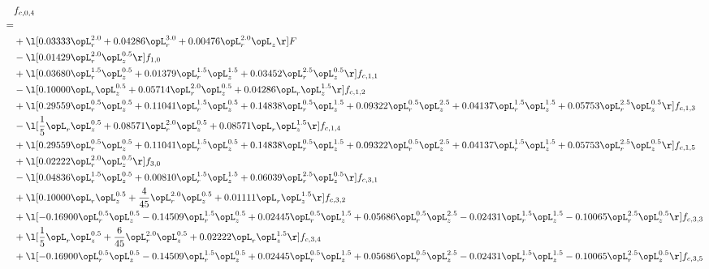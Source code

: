 \begin{alignat}{2} 
\label{eq:f_04_1} 
& f_{c,0,4} \nonumber \\ 
 = \\ 
& + \l[  0.03333 \opL_r^{2.0} +  0.04286 \opL_r^{3.0} +  0.00476 \opL_r^{2.0} \opL_z  \r] F \nonumber \\ 
& - \l[  0.01429 \opL_r^{2.0} \opL_z^{0.5}  \r] f_{1,0} \nonumber \\ 
& + \l[  0.03680 \opL_r^{1.5} \opL_z^{0.5} +  0.01379 \opL_r^{1.5} \opL_z^{1.5} +  0.03452 \opL_r^{2.5} \opL_z^{0.5}  \r] f_{c,1,1} \nonumber \\ 
& - \l[  0.10000 \opL_r \opL_z^{0.5} +  0.05714 \opL_r^{2.0} \opL_z^{0.5} +  0.04286 \opL_r \opL_z^{1.5}  \r] f_{c,1,2} \nonumber \\ 
& + \l[  0.29559 \opL_r^{0.5} \opL_z^{0.5} +  0.11041 \opL_r^{1.5} \opL_z^{0.5} +  0.14838 \opL_r^{0.5} \opL_z^{1.5} +  0.09322 \opL_r^{0.5} \opL_z^{2.5} +  0.04137 \opL_r^{1.5} \opL_z^{1.5} +  0.05753 \opL_r^{2.5} \opL_z^{0.5}  \r] f_{c,1,3} \nonumber \\ 
& - \l[ \frac{1}{5} \opL_r \opL_z^{0.5} +  0.08571 \opL_r^{2.0} \opL_z^{0.5} +  0.08571 \opL_r \opL_z^{1.5}  \r] f_{c,1,4} \nonumber \\ 
& + \l[  0.29559 \opL_r^{0.5} \opL_z^{0.5} +  0.11041 \opL_r^{1.5} \opL_z^{0.5} +  0.14838 \opL_r^{0.5} \opL_z^{1.5} +  0.09322 \opL_r^{0.5} \opL_z^{2.5} +  0.04137 \opL_r^{1.5} \opL_z^{1.5} +  0.05753 \opL_r^{2.5} \opL_z^{0.5}  \r] f_{c,1,5} \nonumber \\ 
& + \l[  0.02222 \opL_r^{2.0} \opL_z^{0.5}  \r] f_{3,0} \nonumber \\ 
& - \l[  0.04836 \opL_r^{1.5} \opL_z^{0.5} +  0.00810 \opL_r^{1.5} \opL_z^{1.5} +  0.06039 \opL_r^{2.5} \opL_z^{0.5}  \r] f_{c,3,1} \nonumber \\ 
& + \l[  0.10000 \opL_r \opL_z^{0.5} + \frac{4}{45} \opL_r^{2.0} \opL_z^{0.5} +  0.01111 \opL_r \opL_z^{1.5}  \r] f_{c,3,2} \nonumber \\ 
& + \l[  -0.16900 \opL_r^{0.5} \opL_z^{0.5}   -0.14509 \opL_r^{1.5} \opL_z^{0.5} +  0.02445 \opL_r^{0.5} \opL_z^{1.5} +  0.05686 \opL_r^{0.5} \opL_z^{2.5}   -0.02431 \opL_r^{1.5} \opL_z^{1.5}   -0.10065 \opL_r^{2.5} \opL_z^{0.5}  \r] f_{c,3,3} \nonumber \\ 
& + \l[ \frac{1}{5} \opL_r \opL_z^{0.5} + \frac{6}{45} \opL_r^{2.0} \opL_z^{0.5} +  0.02222 \opL_r \opL_z^{1.5}  \r] f_{c,3,4} \nonumber \\ 
& + \l[  -0.16900 \opL_r^{0.5} \opL_z^{0.5}   -0.14509 \opL_r^{1.5} \opL_z^{0.5} +  0.02445 \opL_r^{0.5} \opL_z^{1.5} +  0.05686 \opL_r^{0.5} \opL_z^{2.5}   -0.02431 \opL_r^{1.5} \opL_z^{1.5}   -0.10065 \opL_r^{2.5} \opL_z^{0.5}  \r] f_{c,3,5} \nonumber \\ 

\end{alignat}
